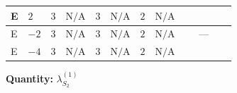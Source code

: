 \documentclass[8pt]{article}
\begin{document}
\begin{landscape}
\begin{longtable}{@{}llcccccc >{\raggedright\arraybackslash}p{0.21\linewidth} >{\raggedright\arraybackslash}p{0.21\linewidth} >{\raggedright\arraybackslash}p{0.21\linewidth}@{}}
\midrule
E & $2$ & $3$ & $\text{N/A}$ & $3$ & $\text{N/A}$ & $2$ & $\text{N/A}$ & \scriptsize\adjustbox{max width=\linewidth}{$\begin{gathered} -24 {g_2}^2 {\lambda_{S_2}^{(1)}}\end{gathered}$} & \scriptsize\adjustbox{max width=\linewidth}{$\begin{gathered} +192 {g_1}^4\end{gathered}$} & \scriptsize\adjustbox{max width=\linewidth}{$\begin{gathered} +6 {\lambda_{12}^{(1)}}^2\end{gathered}$} \\
\midrule
E & $-2$ & $3$ & $\text{N/A}$ & $3$ & $\text{N/A}$ & $2$ & $\text{N/A}$ & \scriptsize\adjustbox{max width=\linewidth}{$\begin{gathered} -24 {g_2}^2 {\lambda_{S_2}^{(1)}}\end{gathered}$} & --- & \scriptsize\adjustbox{max width=\linewidth}{$\begin{gathered} +6 {\lambda_{12}^{(1)}}^2\end{gathered}$} \\
\midrule
E & $-4$ & $3$ & $\text{N/A}$ & $3$ & $\text{N/A}$ & $2$ & $\text{N/A}$ & \scriptsize\adjustbox{max width=\linewidth}{$\begin{gathered} -24 {g_2}^2 {\lambda_{S_2}^{(1)}}\end{gathered}$} & \scriptsize\adjustbox{max width=\linewidth}{$\begin{gathered} +12 {g_1}^4\end{gathered}$} & \scriptsize\adjustbox{max width=\linewidth}{$\begin{gathered} +6 {\lambda_{12}^{(1)}}^2\end{gathered}$} \\
\midrule
\bottomrule
\end{longtable}
\clearpage
\noindent\textbf{Quantity: }$\lambda_{S_2}^{(1)}$\par\smallskip

\end{landscape}
\end{document}
